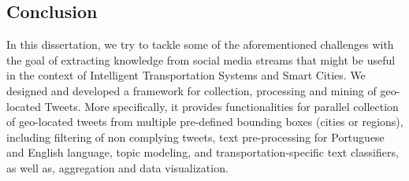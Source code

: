 \documentclass[9pt,a4paper]{extarticle}
\begin{document}
\begin{multicols}{2}






\section{Conclusion}\label{sec:conclusion}

In this dissertation, we try to tackle some of the aforementioned challenges with the goal of extracting knowledge from social media streams that might be useful in the context of Intelligent Transportation Systems and Smart Cities. We designed and developed a framework for collection, processing and mining of geo-located Tweets. More specifically, it provides functionalities for parallel collection of geo-located tweets from multiple pre-defined bounding boxes (cities or regions), including filtering of non complying tweets, text pre-processing for Portuguese and English language, topic modeling, and transportation-specific text classifiers, as well as, aggregation and data visualization. 





\end{multicols}
\end{document}
